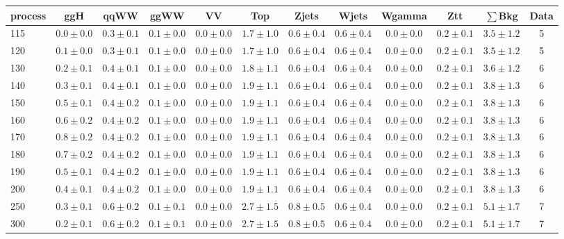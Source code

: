 \begin{table}[!hb]
{\footnotesize
 \begin{center}
 \begin{tabular}{l c c c c c c c c c c c }
 \hline
 process & ggH & qqWW & ggWW & VV & Top & Zjets & Wjets & Wgamma & Ztt & $\sum$Bkg & Data \\
 \hline
115 & $0.0\pm0.0$ & $0.3\pm0.1$ & $0.1\pm0.0$ & $0.0\pm0.0$ & $1.7\pm1.0$ & $0.6\pm0.4$ & $0.6\pm0.4$ & $0.0\pm0.0$ & $0.2\pm0.1$ & $3.5\pm1.2$ & 5 \\
120 & $0.1\pm0.0$ & $0.3\pm0.1$ & $0.1\pm0.0$ & $0.0\pm0.0$ & $1.7\pm1.0$ & $0.6\pm0.4$ & $0.6\pm0.4$ & $0.0\pm0.0$ & $0.2\pm0.1$ & $3.5\pm1.2$ & 5 \\
130 & $0.2\pm0.1$ & $0.4\pm0.1$ & $0.1\pm0.0$ & $0.0\pm0.0$ & $1.8\pm1.1$ & $0.6\pm0.4$ & $0.6\pm0.4$ & $0.0\pm0.0$ & $0.2\pm0.1$ & $3.6\pm1.2$ & 6 \\
140 & $0.3\pm0.1$ & $0.4\pm0.1$ & $0.1\pm0.0$ & $0.0\pm0.0$ & $1.9\pm1.1$ & $0.6\pm0.4$ & $0.6\pm0.4$ & $0.0\pm0.0$ & $0.2\pm0.1$ & $3.8\pm1.3$ & 6 \\
150 & $0.5\pm0.1$ & $0.4\pm0.2$ & $0.1\pm0.0$ & $0.0\pm0.0$ & $1.9\pm1.1$ & $0.6\pm0.4$ & $0.6\pm0.4$ & $0.0\pm0.0$ & $0.2\pm0.1$ & $3.8\pm1.3$ & 6 \\
160 & $0.6\pm0.2$ & $0.4\pm0.2$ & $0.1\pm0.0$ & $0.0\pm0.0$ & $1.9\pm1.1$ & $0.6\pm0.4$ & $0.6\pm0.4$ & $0.0\pm0.0$ & $0.2\pm0.1$ & $3.8\pm1.3$ & 6 \\
170 & $0.8\pm0.2$ & $0.4\pm0.2$ & $0.1\pm0.0$ & $0.0\pm0.0$ & $1.9\pm1.1$ & $0.6\pm0.4$ & $0.6\pm0.4$ & $0.0\pm0.0$ & $0.2\pm0.1$ & $3.8\pm1.3$ & 6 \\
180 & $0.7\pm0.2$ & $0.4\pm0.2$ & $0.1\pm0.0$ & $0.0\pm0.0$ & $1.9\pm1.1$ & $0.6\pm0.4$ & $0.6\pm0.4$ & $0.0\pm0.0$ & $0.2\pm0.1$ & $3.8\pm1.3$ & 6 \\
190 & $0.5\pm0.1$ & $0.4\pm0.2$ & $0.1\pm0.0$ & $0.0\pm0.0$ & $1.9\pm1.1$ & $0.6\pm0.4$ & $0.6\pm0.4$ & $0.0\pm0.0$ & $0.2\pm0.1$ & $3.8\pm1.3$ & 6 \\
200 & $0.4\pm0.1$ & $0.4\pm0.2$ & $0.1\pm0.0$ & $0.0\pm0.0$ & $1.9\pm1.1$ & $0.6\pm0.4$ & $0.6\pm0.4$ & $0.0\pm0.0$ & $0.2\pm0.1$ & $3.8\pm1.3$ & 6 \\
250 & $0.3\pm0.1$ & $0.6\pm0.2$ & $0.1\pm0.1$ & $0.0\pm0.0$ & $2.7\pm1.5$ & $0.8\pm0.5$ & $0.6\pm0.4$ & $0.0\pm0.0$ & $0.2\pm0.1$ & $5.1\pm1.7$ & 7 \\
300 & $0.2\pm0.1$ & $0.6\pm0.2$ & $0.1\pm0.1$ & $0.0\pm0.0$ & $2.7\pm1.5$ & $0.8\pm0.5$ & $0.6\pm0.4$ & $0.0\pm0.0$ & $0.2\pm0.1$ & $5.1\pm1.7$ & 7 \\

\end{tabular}
\end{center}}
\end{table}
